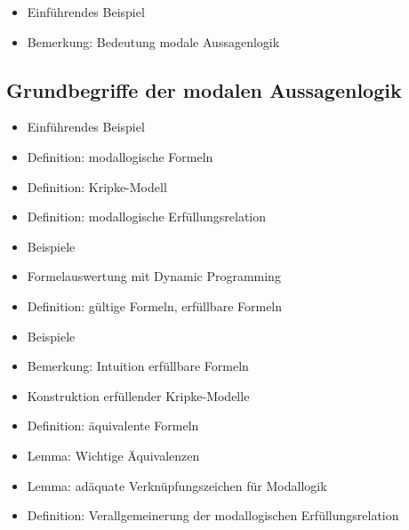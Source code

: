 \documentclass[8pt,fleqn,a4paper,twoside]{article}
\begin{document}
\begin{multicols}{2}
    \begin{itemize}
      \item Einführendes Beispiel
      \item Bemerkung: Bedeutung modale Aussagenlogik
    \end{itemize}

    \subsection{Grundbegriffe der modalen Aussagenlogik} %
    \label{sub:grundbegriffe_der_modalen_aussagenlogik}
      \begin{itemize}
        \item Einführendes Beispiel
        \item Definition: modallogische Formeln
        \item Definition: Kripke-Modell
        \item Definition: modallogische Erfüllungsrelation
        \item Beispiele
        \item Formelauswertung mit Dynamic Programming
        \item Definition: gültige Formeln, erfüllbare Formeln
        \item Beispiele
        \item Bemerkung: Intuition erfüllbare Formeln
        \item Konstruktion erfüllender Kripke-Modelle
        \item Definition: äquivalente Formeln
        \item Lemma: Wichtige Äquivalenzen
        \item Lemma: adäquate Verknüpfungszeichen für Modallogik
        \item Definition: Verallgemeinerung der modallogischen Erfüllungsrelation
      \end{itemize}


\end{multicols}
\end{document}
